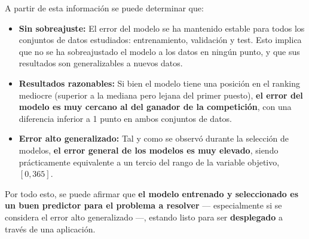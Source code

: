 A partir de esta información se puede determinar que:
\begin{itemize}[parsep=1pt, itemsep=2pt, topsep=4pt]
	\item \textbf{Sin sobreajuste:} El error del modelo se ha mantenido estable para todos los conjuntos de datos estudiados: entrenamiento, validación y test. Esto implica que no se ha sobreajustado el modelo a los datos en ningún punto, y que sus resultados son generalizables a nuevos datos.
	\item \textbf{Resultados razonables:} Si bien el modelo tiene una posición en el ranking mediocre (superior a la mediana pero lejana del primer puesto), \textbf{el error del modelo es muy cercano al del ganador de la competición}, con una diferencia inferior a 1 punto en ambos conjuntos de datos.
	\item \textbf{Error alto generalizado:} Tal y como se observó durante la selección de modelos, \textbf{el error general de los modelos es muy elevado}, siendo prácticamente equivalente a un tercio del rango de la variable objetivo, $[0,365]$.
\end{itemize}

Por todo esto, se puede afirmar que \textbf{el modelo entrenado y seleccionado es un buen predictor para el problema a resolver} --- especialmente si se considera el error alto generalizado ---, estando listo para ser \textbf{desplegado} a través de una aplicación.